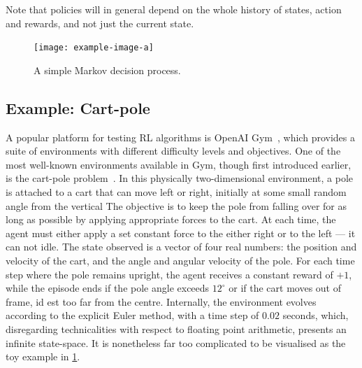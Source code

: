 Note that policies will in general depend on the whole history of states, action and rewards, and not just the current state.

\begin{figure}
    \centering
    \texttt{[image: example-image-a]}

    \caption{A simple Markov decision process.}
    \label{fig:mdp}
\end{figure}


\subsection{Example: Cart-pole}
A popular platform for testing RL algorithms is OpenAI Gym~\autocite{gym}, which provides a suite of environments with different difficulty levels and objectives.
One of the most well-known environments available in Gym, though first introduced earlier, is the cart-pole problem~\autocite{barto1983}.
In this physically two-dimensional environment, a pole is attached to a cart that can move left or right, initially at some small random angle from the vertical
The objective is to keep the pole from falling over for as long as possible by applying appropriate forces to the cart.
At each time, the agent must either apply a set constant force to the either right or to the left — it can not idle.
The state observed is a vector of four real numbers: the position and velocity of the cart, and the angle and angular velocity of the pole.
For each time step where the pole remains upright, the agent receives a constant reward of $+1$, while the episode ends if the pole angle exceeds $12^\circ$ or if the cart moves out of frame, id est too far from the centre.
Internally, the environment evolves according to the explicit Euler method, with a time step of $0.02$ seconds\footnotemark, which, disregarding technicalities with respect to floating point arithmetic, presents an infinite state-space.
It is nonetheless far too complicated to be visualised as the toy example in \cref{fig:mdp}.


